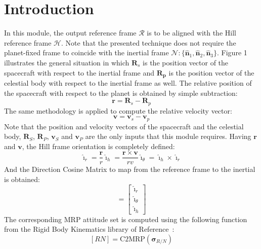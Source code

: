 \documentclass[]{AVSSimReportMemo}
\begin{document}
\section{Introduction}
In this module, the output reference frame $\mathcal{R}$ is to be aligned with the Hill reference frame $\mathcal{H}$. Note that the presented technique does not require the planet-fixed  frame to coincide with the inertial frame $\mathcal{N}:\{ \hat{\bm n}_{1}, \hat{\bm n}_{2}, \hat{\bm n}_{3} \}$. Figure 1 illustrates the general situation in which $\bm{R}_{s}$ is the position vector of the spacecraft with respect to the inertial frame and $\bm{R_{p}}$ is the position vector of the  celestial body with respect to the inertial frame as well.
The relative position of the spacecraft with respect to the planet is obtained by simple subtraction:
\begin{equation}
	\label{eq:r}
	\bm r = \bm R_{s} -  \bm R_{p}
\end{equation}
The same methodology is applied to compute the relative velocity vector:
\begin{equation}
	\label{eq:v}
	\bm v = \bm v_{s} -  \bm v_{p}
\end{equation}
Note that the position and velocity vectors of the spacecraft and the celestial body, $\bm{R}_S$,  $\bm{R}_P$,  $\bm{v}_S$ and  $\bm{v}_P$ are the only inputs that this module requires. Having $\bm r$ and $\bm v$, the Hill frame orientation is completely defined:
\begin{subequations}
	\begin{equation}
	\hat{\bm\imath}_{r} = \frac{\bm r}{r} 
	\end{equation}
	\begin{equation}
	\hat{\bm\imath}_{h} = \frac{\bm{r}\times{\bm{v}}}{r v}
	\end{equation}
	\begin{equation}
	\hat{\bm\imath}_{\theta} = \hat{\bm\imath}_{h} \times \hat{\bm\imath}_{r}
	\end{equation}
\end{subequations}
And the Direction Cosine Matrix to map from the reference frame to the inertial is obtained:
\begin{equation}
	[RN] =  \begin{bmatrix}
       		\hat{\bm\imath}_{r} \\
		\hat{\bm\imath}_{\theta} \\ 
		\hat{\bm\imath}_{h}
      \end{bmatrix}
\end{equation}
The corresponding MRP attitude set is computed using the following function from the Rigid Body Kinematics library of Reference~:
$$ [RN] = \textrm{C2MRP}(\bm\sigma_{R/N})$$
\end{document}
